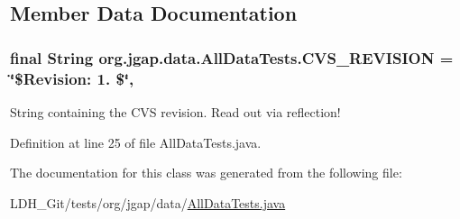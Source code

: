 \subsection{Member Data Documentation}
\hypertarget{classorg_1_1jgap_1_1data_1_1_all_data_tests_a743fe7ce2cd1b103cb2f1a693f883a29}{
\subsubsection[{C\-V\-S\-\_\-\-R\-E\-V\-I\-S\-I\-O\-N}]{\setlength{\rightskip}{0pt plus 5cm}final String org.\-jgap.\-data.\-All\-Data\-Tests.\-C\-V\-S\-\_\-\-R\-E\-V\-I\-S\-I\-O\-N = \char`\"{}\$Revision\-: 1. \$\char`\"{}\hspace{0.3cm}{\ttfamily [static]}, {\ttfamily [private]}}}\label{classorg_1_1jgap_1_1data_1_1_all_data_tests_a743fe7ce2cd1b103cb2f1a693f883a29}
String containing the C\-V\-S revision. Read out via reflection! 

Definition at line 25 of file All\-Data\-Tests.\-java.



The documentation for this class was generated from the following file\-:\begin{DoxyCompactItemize}
\item 
L\-D\-H\-\_\-\-Git/tests/org/jgap/data/\hyperlink{_all_data_tests_8java}{All\-Data\-Tests.\-java}\end{DoxyCompactItemize}
